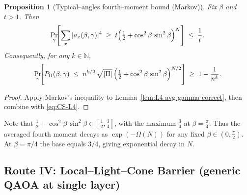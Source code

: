 \documentclass[a4paper,onecolumn,11pt,unpublished]{quantumarticle}
\newtheorem{proposition}[theorem]{Proposition}
\theoremstyle{remark}
\begin{document}



\begin{proposition}[Typical–angles fourth–moment bound (Markov)]
\label{prop:typical-L4}
Fix $\beta$ and $t>1$. Then
\[
  \Pr_{\gamma}\!\Biggl[\sum_{x}|a_x(\beta,\gamma)|^4
  \;\ge\; t\Bigl(\tfrac12+\cos^2\beta\,\sin^2\beta\Bigr)^{N}\Biggr]
  \;\le\; \frac{1}{t}.
\]
Consequently, for any $k\in\mathbb N$,
\[
  \Pr_{\gamma}\!\Biggl[P_{\Pi}(\beta,\gamma)\;\le\;
  n^{k/2}\,\sqrt{|\Pi|}\,\Bigl(\tfrac12+\cos^2\beta\,\sin^2\beta\Bigr)^{N/2}\Biggr]
  \;\ge\; 1-\frac{1}{n^{k}}.
\]
\end{proposition}

\begin{proof}
Apply Markov’s inequality to Lemma~\ref{lem:L4-avg-gamma-correct}, then combine
with \eqref{eq:CS-L4}.
\end{proof}

Note that $\tfrac12+\cos^2\beta\,\sin^2\beta \in [\tfrac12,\tfrac34]$, with the maximum $\tfrac34$ at $\beta=\tfrac\pi4$. Thus the averaged fourth moment decays as
$\exp(-\Omega(N))$ for any fixed $\beta\in(0,\tfrac\pi2)$. At $\beta=\pi/4$ the base equals $3/4$, giving exponential decay in $N$.

\subsection{Route IV: Local–Light–Cone Barrier (generic QAOA at single layer)}
\label{app:lightcone}
\end{document}
